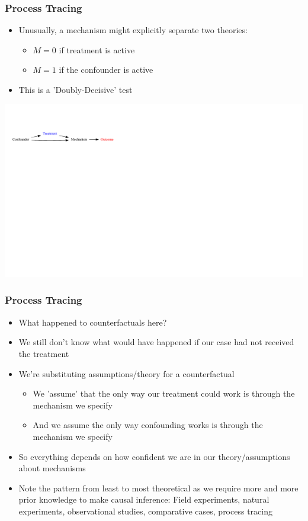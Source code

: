 \documentclass[xcolor=x11names,compress]{beamer}\usepackage[]{graphicx}\usepackage[]{color}
\newenvironment{knitrout}{}{} %
\renewcommand{\(}{\begin{columns}}
\renewcommand{\)}{\end{columns}}
\newcommand{\<}[1]{\begin{column}{#1}}
\renewcommand{\>}{\end{column}}
\begin{document}
\begin{frame}
\frametitle{Process Tracing}
\begin{itemize}
\item Unusually, a mechanism might explicitly separate two theories:
\begin{itemize}
\item $M=0$ if treatment is active
\item $M=1$ if the confounder is active
\end{itemize}
\item This is a 'Doubly-Decisive' test
\end{itemize}
\begin{knitrout}
\color{fgcolor}
\includegraphics[width=1.8\linewidth]{figure/Dag5-1} 

\end{knitrout}
\end{frame}

\begin{frame}
\frametitle{Process Tracing}
\begin{itemize}
\item What happened to counterfactuals here?
\pause
\item We still don't know what would have happened if our case had not received the treatment
\pause
\item We're substituting assumptions/theory for a counterfactual
\pause
\begin{itemize}
\item We 'assume' that the only way our treatment could work is through the mechanism we specify
\pause
\item And we assume the only way confounding works is through the mechanism we specify
\end{itemize}
\item So everything depends on how confident we are in our theory/assumptions about mechanisms
\pause
\item Note the pattern from least to most theoretical as we require more and more prior knowledge to make causal inference: Field experiments, natural experiments, observational studies, comparative cases, process tracing
\end{itemize}
\end{frame}
\end{document}

